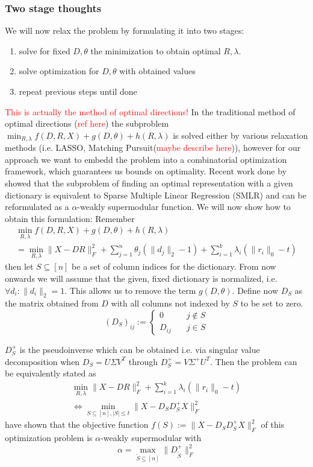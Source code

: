 \documentclass{article}
\begin{document}
\subsubsection{Two stage thoughts}
We will now relax the problem by formulating it into two stages:
\begin{enumerate}
\item solve for fixed $D, \theta$ the minimization to obtain optimal $R, \lambda$.
\item solve optimization for $D, \theta$ with obtained values
\item repeat previous steps until done
\end{enumerate}
\textcolor{red}{This is actually the method of optimal directions!}
In the traditional method of optimal directions (\textcolor{red}{ref here}) the subproblem $\min_{R, \lambda} f(D, R, X) + g(D, \theta) + h(R, \lambda)$ is solved either by various relaxation methods (i.e. LASSO, Matching Pursuit(\textcolor{red}{maybe describe here})), however for our approach we want to embedd the problem into a combinatorial optimization framework, which guarantees us bounds on optimality. Recent work done by \cite{weaklyalpha} showed that the subproblem of finding an optimal representation with a given dictionary is equivalent to Sparse Multiple Linear Regression (SMLR) and can be reformulated as a $\alpha$-weakly supermodular function. We will now show how to obtain this formulation:
Remember
\[
\begin{split}
\min_{R, \lambda} f(D, R, X) + g(D, \theta) + h(R, \lambda) \\
= \min_{R, \lambda} \|X -D R\|_F^2 + \sum_{j=1}^n \theta_j (\| d_j\|_2 - 1)+ \sum_{i=1}^k \lambda_i (\| r_i \|_0 - t)
\end{split}
\]
then let $S \subseteq [n]$ be a set of column indices for the dictionary. From now onwards we will assume that the given, fixed dictionary is normalized, i.e. $\forall d_i: \|d_i \|_2 = 1$. This allows us to remove the term $g(D, \theta)$. Define now $D_S$ as the matrix obtained from $D$ with all columns not indexed by $S$ to be set to zero.
\[
(D_S)_{ij} := \begin{cases}
0 \quad &j \notin S \\
D_{ij} \quad &j\in S
\end{cases}
\]

$D_S^+$ is the pseudoinverse which can be obtained i.e. via singular value decomposition when $D_S = U\Sigma V^T$ through $D_S^+ = V \Sigma^+ U^T$.
Then the problem can be equivalently stated as
\[
\begin{split}
 \min_{R, \lambda} \|X  -D R\|_F^2 + \sum_{i=1}^k \lambda_i (\| r_i \|_0 - t)\\
 \Longleftrightarrow 
  \min_{S \subseteq [n], |S| \leq t} \|X  -D_SD_S^+ X\|_F^2
 \end{split}
\]
\cite{weaklyalpha} have shown that the objective function $f(S) := \|X  -D_SD_S^+ X\|_F^2$ of this optimization problem is $\alpha$-weakly supermodular with 
\[ 
\alpha = \max_{\tilde{S} \subseteq [n]}\| D_{\tilde{S}}^+ \|_F^2
\]
\end{document}
